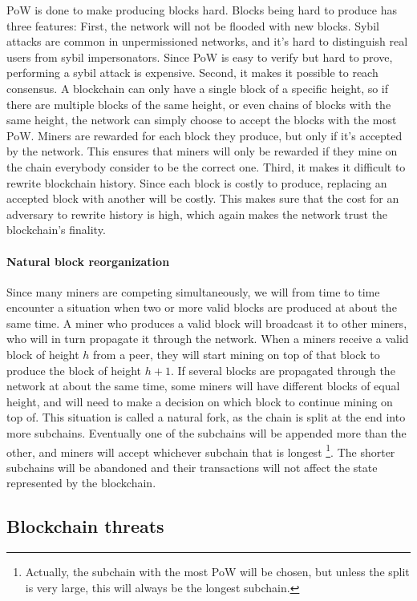 PoW is done to make producing blocks hard. Blocks being hard to produce has three features: First, the network will not be flooded with new blocks. Sybil attacks are common in unpermissioned networks, and it's hard to distinguish real users from sybil impersonators. Since PoW is easy to verify but hard to prove, performing a sybil attack is expensive. Second, it makes it possible to reach consensus. A blockchain can only have a single block of a specific height, so if there are multiple blocks of the same height, or even chains of blocks with the same height, the network can simply choose to accept the blocks with the most PoW. Miners are rewarded for each block they produce, but only if it's accepted by the network. This ensures that miners will only be rewarded if they mine on the chain everybody consider to be the correct one. Third, it makes it difficult to rewrite blockchain history. Since each block is costly to produce, replacing an accepted block with another will be costly. This makes sure that the cost for an adversary to rewrite history is high, which again makes the network trust the blockchain's finality.

\paragraph{Natural block reorganization}
Since many miners are competing simultaneously, we will from time to time encounter a situation when two or more valid blocks are produced at about the same time. A miner who produces a valid block will broadcast it to other miners, who will in turn propagate it through the network. When a miners receive a valid block of height $h$ from a peer, they will start mining on top of that block to produce the block of height $h+1$. If several blocks are propagated through the network at about the same time, some miners will have different blocks of equal height, and will need to make a decision on which block to continue mining on top of. This situation is called a natural fork, as the chain is split at the end into more subchains. Eventually one of the subchains will be appended more than the other, and miners will accept whichever subchain that is longest \footnote{Actually, the subchain with the most PoW will be chosen, but unless the split is very large, this will always be the longest subchain.}. The shorter subchains will be abandoned and their transactions will not affect the state represented by the blockchain.


\subsection{Blockchain threats}

